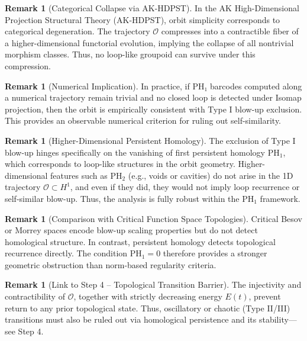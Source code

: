 \documentclass[11pt]{article}
\theoremstyle{definition}
\newtheorem{remark}[theorem]{Remark}
\begin{document}
\begin{remark}[Categorical Collapse via AK-HDPST]
In the AK High-Dimensional Projection Structural Theory (AK-HDPST), orbit simplicity corresponds to categorical degeneration. The trajectory $\mathcal{O}$ compresses into a contractible fiber of a higher-dimensional functorial evolution, implying the collapse of all nontrivial morphism classes. Thus, no loop-like groupoid can survive under this compression.
\end{remark}

\begin{remark}[Numerical Implication]
In practice, if PH₁ barcodes computed along a numerical trajectory remain trivial and no closed loop is detected under Isomap projection, then the orbit is empirically consistent with Type I blow-up exclusion. This provides an observable numerical criterion for ruling out self-similarity.
\end{remark}

\begin{remark}[Higher-Dimensional Persistent Homology]
The exclusion of Type I blow-up hinges specifically on the vanishing of first persistent homology $\mathrm{PH}_1$, which corresponds to loop-like structures in the orbit geometry. Higher-dimensional features such as $\mathrm{PH}_2$ (e.g., voids or cavities) do not arise in the 1D trajectory $\mathcal{O} \subset H^1$, and even if they did, they would not imply loop recurrence or self-similar blow-up. Thus, the analysis is fully robust within the $\mathrm{PH}_1$ framework.
\end{remark}

\begin{remark}[Comparison with Critical Function Space Topologies]
Critical Besov or Morrey spaces encode blow-up scaling properties but do not detect homological structure. In contrast, persistent homology detects topological recurrence directly. The condition $\mathrm{PH}_1 = 0$ therefore provides a stronger geometric obstruction than norm-based regularity criteria.
\end{remark}

\begin{remark}[Link to Step 4 – Topological Transition Barrier]
The injectivity and contractibility of $\mathcal{O}$, together with strictly decreasing energy $E(t)$, prevent return to any prior topological state. Thus, oscillatory or chaotic (Type II/III) transitions must also be ruled out via homological persistence and its stability—see Step 4.
\end{remark}
\end{document}
